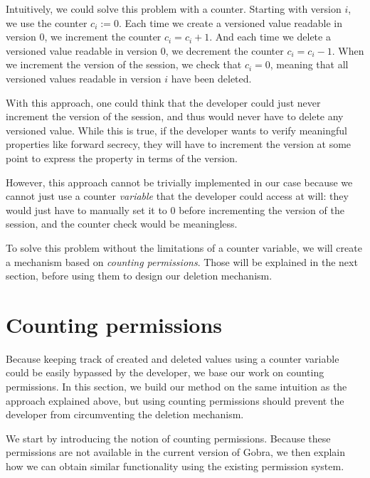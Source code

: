 Intuitively, we could solve this problem with a counter. Starting with version $i$, we use the counter $c_i:=0$.
Each time we create a versioned value readable in version $0$, we increment the counter $c_i = c_i + 1$.
And each time we delete a versioned value readable in version $0$, we decrement the counter $c_i = c_i - 1$.
When we increment the version of the session, we check that $c_i = 0$, meaning that all versioned values readable in version $i$ have been deleted.


With this approach, one could think that the developer could just never increment the version of the session, and thus would never have to delete any versioned value. While this is true, if the developer wants to verify meaningful properties like forward secrecy, they will have to increment the version at some point to express the property in terms of the version.

However, this approach cannot be trivially implemented in our case because we cannot just use a counter \emph{variable} that the developer could access at will: they would just have to manually set it to $0$ before incrementing the version of the session, and the counter check would be meaningless.

To solve this problem without the limitations of a counter variable, we will create a mechanism based on \emph{counting permissions}. Those will be explained in the next section, before using them to design our deletion mechanism.

\section{Counting permissions}
\label{sec:counting-permissions}

Because keeping track of created and deleted values using a counter variable could be easily bypassed by the developer, we base our work on counting permissions.
In this section, we build our method on the same intuition as the approach explained above, but using counting permissions should prevent the developer from circumventing the deletion mechanism.

We start by introducing the notion of counting permissions.
Because these permissions are not available in the current version of Gobra, we then explain how we can obtain similar functionality using the existing permission system.

